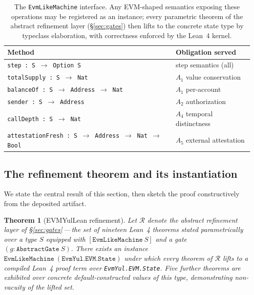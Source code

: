 \documentclass[11pt,a4paper]{article}
\newtheorem{theorem}{Theorem}
\begin{document}
\begin{table}[h]
\centering
\small
\begin{tabular}{ll}
\toprule
Method & Obligation served \\
\midrule
\texttt{step : S $\to$ Option S}                            & step semantics (all) \\
\texttt{totalSupply : S $\to$ Nat}                          & $A_1$ value conservation \\
\texttt{balanceOf : S $\to$ Address $\to$ Nat}              & $A_1$ per-account \\
\texttt{sender : S $\to$ Address}                           & $A_2$ authorization \\
\texttt{callDepth : S $\to$ Nat}                            & $A_4$ temporal distinctness \\
\texttt{attestationFresh : S $\to$ Address $\to$ Nat $\to$ Bool} & $A_5$ external attestation \\
\bottomrule
\end{tabular}
\caption{The \texttt{EvmLikeMachine} interface. Any EVM-shaped semantics exposing these operations may be registered as an instance; every parametric theorem of the abstract refinement layer (\S\ref{sec:gates}) then lifts to the concrete state type by typeclass elaboration, with correctness enforced by the Lean~4 kernel.}\label{tab:evm-typeclass}
\end{table}

\subsection{The refinement theorem and its instantiation}

We state the central result of this section, then sketch the proof constructively from the deposited artifact.

\begin{theorem}[EVMYulLean refinement]\label{thm:evmyul-refinement}
Let $\mathcal{R}$ denote the abstract refinement layer of \S\ref{sec:gates}\,---\,the set of nineteen Lean~4 theorems stated parametrically over a type $S$ equipped with $[\texttt{EvmLikeMachine}\ S]$ and a gate $(g : \texttt{AbstractGate}\ S)$. There exists an instance $\texttt{EvmLikeMachine}\ (\texttt{EvmYul.EVM.State})$ under which every theorem of $\mathcal{R}$ lifts to a compiled Lean~4 proof term over \texttt{EvmYul.EVM.State}. Five further theorems are exhibited over concrete default-constructed values of this type, demonstrating non-vacuity of the lifted set.
\end{theorem}
\end{document}

